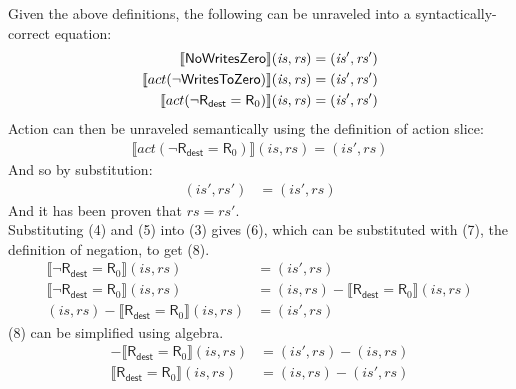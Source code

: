 \documentclass[12pt, letterpaper]{article}
\begin{document}
    Given the above definitions, the following can be unraveled into a syntactically-correct equation:
\begin{align}
    \setcounter{equation}{0}
    \llbracket \mathsf{NoWritesZero} \rrbracket (\mathit{is}, \mathit{rs}) 
    &=
    (\mathit{is}', \mathit{rs}')
    \\
    \llbracket act(\neg \mathsf{WritesToZero}) \rrbracket (\mathit{is}, \mathit{rs}) 
    &=
    (\mathit{is}', \mathit{rs}')
    \\
    \llbracket act(\neg \mathsf{R}_{\mathsf{dest}} = \mathsf{R}_0) \rrbracket (\mathit{is}, \mathit{rs}) 
    &=
    (\mathit{is}', \mathit{rs}')
\end{align}
    Action can then be unraveled semantically using the definition of action slice:
\begin{align}
    \llbracket act(\neg \mathsf{R}_{\mathsf{dest}} = \mathsf{R}_0) \rrbracket (\mathit{is}, \mathit{rs}) 
    =
    (\mathit{is}', \mathit{rs})
\end{align}
    And so by substitution:
\begin{align}
    (\mathit{is}', \mathit{rs}')
    &=
    (\mathit{is}', \mathit{rs})
\end{align}
    And it has been proven that $\mathit{rs} = \mathit{rs'}$.\\
    Substituting (4) and (5) into (3) gives (6), which can be substituted with (7), the definition of negation, to get (8). 
\begin{align}
    \llbracket \neg \mathsf{R}_{\mathsf{dest}} = \mathsf{R}_0 \rrbracket (\mathit{is}, \mathit{rs}) 
    &=
    (\mathit{is}', \mathit{rs})\\
    \llbracket \neg \mathsf{R}_{\mathsf{dest}} = \mathsf{R}_0 \rrbracket (\mathit{is}, \mathit{rs}) 
    &=
    (\mathit{is}, \mathit{rs}) - \llbracket \mathsf{R}_{\mathsf{dest}} = \mathsf{R}_0 \rrbracket (\mathit{is}, \mathit{rs})\\ %
    (\mathit{is}, \mathit{rs}) - \llbracket \mathsf{R}_{\mathsf{dest}} = \mathsf{R}_0 \rrbracket (\mathit{is}, \mathit{rs}) 
    &=
    (\mathit{is}', \mathit{rs})
\end{align}
    (8) can be simplified using algebra.
\begin{align}    
    - \llbracket \mathsf{R}_{\mathsf{dest}} = \mathsf{R}_0 \rrbracket (\mathit{is}, \mathit{rs}) 
    &=
    (\mathit{is}', \mathit{rs}) - (\mathit{is}, \mathit{rs})
    \\
    \llbracket \mathsf{R}_{\mathsf{dest}} = \mathsf{R}_0 \rrbracket (\mathit{is}, \mathit{rs}) 
    &=
    (\mathit{is}, \mathit{rs}) - (\mathit{is}', \mathit{rs})
\end{align}
\end{document}
